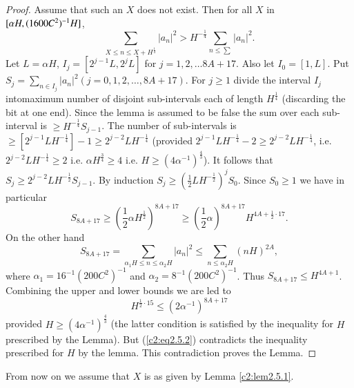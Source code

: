 \begin{proof}
Assume that such an $X$ does not exist. Then for all $X$ in $[\alpha
  H,\break (1600C^2)^{-1} H]$, 
\begin{equation*}
\sum\limits_{X \leq n \leq X + H^{\frac{1}{4}}} |a_n|^2 > H^{-\frac{1}{4}} \sum\limits_{n\leq \sum} |a_n|^2 \tag{2.5.1}. \label{c2:eq2.5.1}
\end{equation*}
Let $L = \alpha H$, $I_j = [2^{j-1} L, 2^j L]$ for $j =1,2, \ldots 8A + 17$. Also let $I_0 = [1,L]$. Put $S_j = \sum\limits_{n\in I_j} |a_n|^2 (j=0,1,2,\ldots, 8A +17)$. For $j \geq 1$ divide the interval $I_j$ into\pageoriginale maximum number of disjoint sub-intervals each of length $H^{\frac{1}{4}}$ (discarding the bit at one end). Since the lemma is assumed to be false  the sum over each sub-interval is $\geq H^{-\frac{1}{4}} S_{j-1}$. The number of sub-intervals is $\geq [2^{j-1} L H^{-\frac{1}{4}}] - 1 \geq 2^{j-2} L H^{-\frac{1}{4}}$ (provided $2^{j-1} LH^{-\frac{1}{4}} - 2 \geq 2^{j-2} LH^{-\frac{1}{4}}$, i.e. $2^{j-2} LH^{-\frac{1}{4}} \geq 2$ i.e. $\alpha H^{\frac{3}{4}} \geq 4$ i.e. $H \geq (4\alpha^{-1})^{\frac{4}{3}}$). It follows that $S_j \geq 2^{j-2} LH^{-\frac{1}{2}} S_{j-1}$. By induction $S_j \geq (\frac{1}{2} LH^{-\frac{1}{2}})^j S_0$. Since $S_0 \geq 1$ we have in particular
$$
S_{8A + 17} \geq \left(\frac{1}{2} \alpha H^{\frac{1}{2}} \right)^{8A + 17} \geq \left( \frac{1}{2} \alpha \right)^{8A + 17} H^{4A + \frac{1}{2} \cdot 17}.
$$
On the other hand 
$$
S_{8A + 17} = \sum\limits_{\alpha_1 H \leq n \leq \alpha_2 H} |a_n|^2 \leq \sum\limits_{n\leq \alpha_2 H} (nH)^{2A},
$$
where $\alpha_1 = 16^{-1} (200 C^2)^{-1}$ and $\alpha_2 = 8^{-1} (200C^2)^{-1}$. Thus $S_{8A +17} \leq H^{4A+1}$. Combining the upper and lower bounds we are led to 
\begin{equation*}
H^{\frac{1}{2} \cdot 15} \leq (2\alpha^{-1})^{8A + 17} \tag{2.5.2}\label{c2:eq2.5.2}
\end{equation*}
provided $H \geq (4\alpha^{-1})^{\frac{4}{3}}$ (the latter condition is satisfied by the inequality for $H$ prescribed by the Lemma). But (\ref{c2:eq2.5.2}) contradicts the inequality prescribed for $H$ by the lemma. This contradiction proves the Lemma.
\end{proof}

From now on we assume that $X$ is as given by Lemma \ref{c2:lem2.5.1}.

